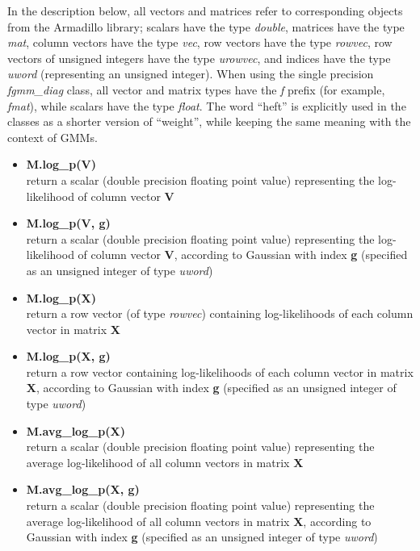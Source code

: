 In the description below, all vectors and matrices refer to corresponding objects from the Armadillo library;
scalars have the type {\it double},
matrices have the type {\it mat},
column vectors have the type {\it vec},
row vectors have the type {\it rowvec},
row vectors of unsigned integers have the type {\it urowvec},
and indices have the type {\it uword} (representing an unsigned integer).
When using the single precision {\it fgmm\_diag} class,
all vector and matrix types have the {\it f} prefix (for example, {\it fmat}),
while scalars have the type {\it float}.
The word ``heft'' is explicitly used in the classes as a shorter version of ``weight'', while keeping the same meaning with the context of GMMs.

\begin{itemize} \itemsep 4pt

\item
{\bf M.log\_p(V)}\\
return a scalar (double precision floating point value) representing the log-likelihood of column vector {\bf V}

\item
{\bf M.log\_p(V, g)}\\
return a scalar (double precision floating point value) representing the log-likelihood of column vector {\bf V},
according to Gaussian with index {\bf g} (specified as an unsigned integer of type {\it uword})

\item
{\bf M.log\_p(X)}\\
return a row vector (of type {\it rowvec}) containing log-likelihoods of each column vector in matrix {\bf X}


\item
{\bf M.log\_p(X, g)}\\
return a row vector containing log-likelihoods of each column vector in matrix {\bf X},
according to Gaussian with index {\bf g}  (specified as an unsigned integer of type {\it uword})

\item
{\bf M.avg\_log\_p(X)}\\
return a scalar (double precision floating point value) representing the average log-likelihood of all column vectors in matrix {\bf X}

\item
{\bf M.avg\_log\_p(X, g)}\\
return a scalar (double precision floating point value) representing the average log-likelihood of all column vectors in matrix {\bf X},
according to Gaussian with index {\bf g}  (specified as an unsigned integer of type {\it uword})


\end{itemize}
